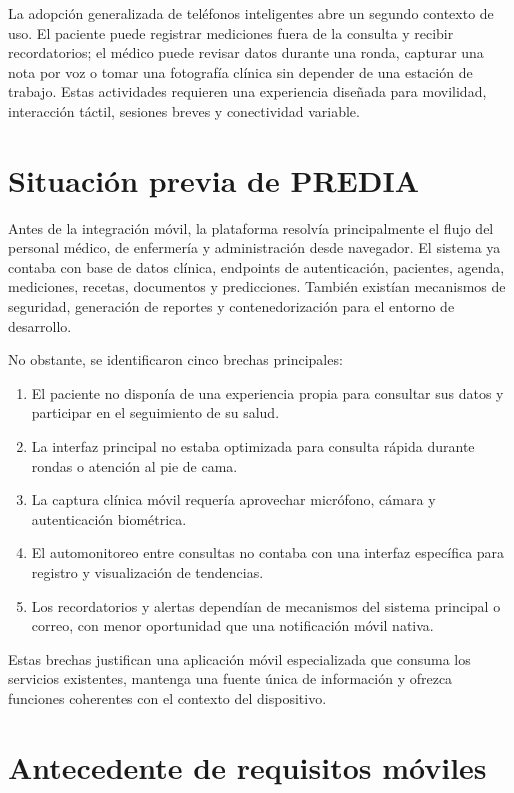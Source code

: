 \documentclass[12pt,letterpaper]{report}
\begin{document}
La adopción generalizada de teléfonos inteligentes abre un segundo contexto de uso. El paciente puede registrar mediciones fuera de la consulta y recibir recordatorios; el médico puede revisar datos durante una ronda, capturar una nota por voz o tomar una fotografía clínica sin depender de una estación de trabajo. Estas actividades requieren una experiencia diseñada para movilidad, interacción táctil, sesiones breves y conectividad variable.

\section{Situación previa de PREDIA}

Antes de la integración móvil, la plataforma resolvía principalmente el flujo del personal médico, de enfermería y administración desde navegador. El sistema ya contaba con base de datos clínica, endpoints de autenticación, pacientes, agenda, mediciones, recetas, documentos y predicciones. También existían mecanismos de seguridad, generación de reportes y contenedorización para el entorno de desarrollo.

No obstante, se identificaron cinco brechas principales:

\begin{enumerate}[label=\arabic*.]
  \item El paciente no disponía de una experiencia propia para consultar sus datos y participar en el seguimiento de su salud.
  \item La interfaz principal no estaba optimizada para consulta rápida durante rondas o atención al pie de cama.
  \item La captura clínica móvil requería aprovechar micrófono, cámara y autenticación biométrica.
  \item El automonitoreo entre consultas no contaba con una interfaz específica para registro y visualización de tendencias.
  \item Los recordatorios y alertas dependían de mecanismos del sistema principal o correo, con menor oportunidad que una notificación móvil nativa.
\end{enumerate}

Estas brechas justifican una aplicación móvil especializada que consuma los servicios existentes, mantenga una fuente única de información y ofrezca funciones coherentes con el contexto del dispositivo.

\section{Antecedente de requisitos móviles}
\end{document}
